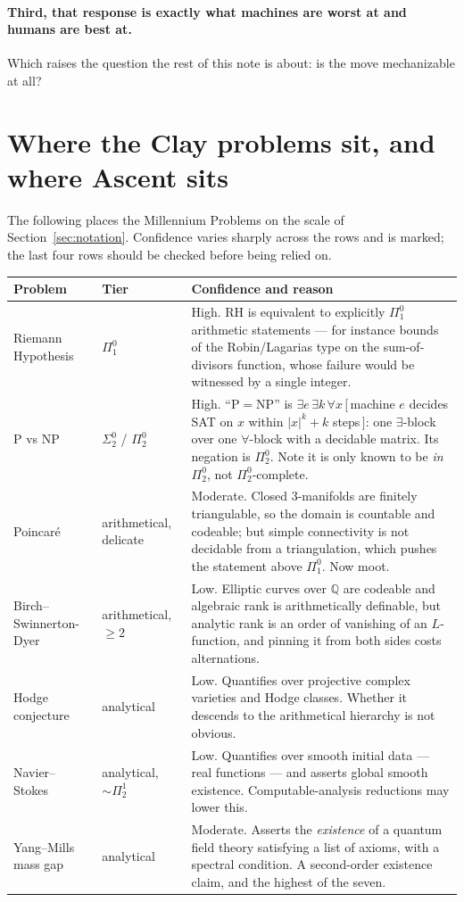 \documentclass[11pt,a4paper]{article}
\newcommand{\Sig}[2]{\Sigma^{#1}_{#2}}
\newcommand{\Pai}[2]{\Pi^{#1}_{#2}}
\begin{document}
\paragraph{Third, that response is exactly what machines are worst at and
humans are best at.} Which raises the question the rest of this note is about:
is the move mechanizable at all?

\section{Where the Clay problems sit, and where Ascent sits}\label{sec:placement}

The following places the Millennium Problems on the scale of
Section~\ref{sec:notation}. Confidence varies sharply across the rows and is
marked; the last four rows should be checked before being relied on.

\begin{center}
\begin{tabular}{@{}llp{7.4cm}@{}}
\toprule
Problem & Tier & Confidence and reason \\
\midrule
Riemann Hypothesis & $\Pai{0}{1}$ & High. RH is equivalent to explicitly
$\Pai{0}{1}$ arithmetic statements --- for instance bounds of the
Robin/Lagarias type on the sum-of-divisors function, whose failure would be
witnessed by a single integer. \\[0.3em]
P vs NP & $\Sig{0}{2}$ / $\Pai{0}{2}$ & High. ``$\mathrm{P}=\mathrm{NP}$'' is
$\exists e\, \exists k\, \forall x\,[\,$machine $e$ decides SAT on $x$ within
$|x|^k + k$ steps$\,]$: one $\exists$-block over one $\forall$-block with a
decidable matrix. Its negation is $\Pai{0}{2}$. Note it is only known to be
\emph{in} $\Pai{0}{2}$, not $\Pai{0}{2}$-complete. \\[0.3em]
Poincar\'e & arithmetical, delicate & Moderate. Closed $3$-manifolds are
finitely triangulable, so the domain is countable and codeable; but simple
connectivity is not decidable from a triangulation, which pushes the statement
above $\Pai{0}{1}$. Now moot. \\[0.3em]
Birch--Swinnerton-Dyer & arithmetical, $\ge 2$ & Low. Elliptic curves over
$\mathbb{Q}$ are codeable and algebraic rank is arithmetically definable, but
analytic rank is an order of vanishing of an $L$-function, and pinning it from
both sides costs alternations. \\[0.3em]
Hodge conjecture & analytical & Low. Quantifies over projective complex
varieties and Hodge classes. Whether it descends to the arithmetical hierarchy
is not obvious. \\[0.3em]
Navier--Stokes & analytical, $\sim\Pai{1}{2}$ & Low. Quantifies over smooth
initial data --- real functions --- and asserts global smooth existence.
Computable-analysis reductions may lower this. \\[0.3em]
Yang--Mills mass gap & analytical & Moderate. Asserts the \emph{existence} of a
quantum field theory satisfying a list of axioms, with a spectral condition. A
second-order existence claim, and the highest of the seven. \\
\bottomrule
\end{tabular}
\end{center}
\end{document}
